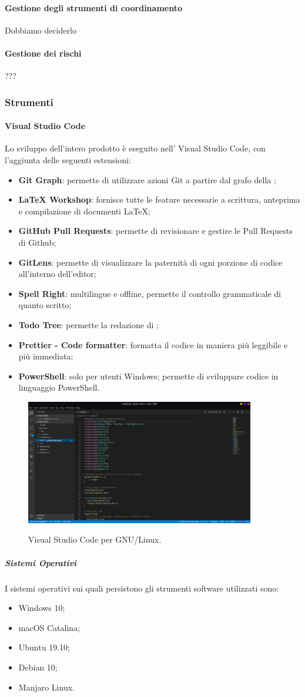 \documentclass[../norme-di-progetto.tex]{subfiles}
\begin{document}
\paragraph{Gestione degli strumenti di coordinamento}
Dobbiamo deciderlo
\paragraph{Gestione dei rischi}
???

\subsubsection{Strumenti}
\paragraph{Visual Studio Code}
Lo sviluppo dell'intero prodotto è eseguito nell' Visual Studio Code, con l'aggiunta delle seguenti estensioni:
\begin{itemize}
  \item \textbf{Git Graph}: permette di utilizzare azioni Git a partire dal grafo della ;
  \item \textbf{LaTeX Workshop}: fornisce tutte le feature necessarie a scrittura, anteprima e compilazione di documenti \LaTeX;
  \item \textbf{GitHub Pull Requests}: permette di revisionare e gestire le Pull Requests di Github;
  \item \textbf{GitLens}: permette di visualizzare la paternità di ogni porzione di codice all'interno dell'editor;
  \item \textbf{Spell Right}:  multilingue e offline, permette il controllo grammaticale di quanto scritto;
  \item \textbf{Todo Tree}: permette la redazione di ;
  \item \textbf{Prettier - Code formatter}: formatta il codice in maniera più leggibile e più immediata;
  \item \textbf{PowerShell}: solo per utenti Windows; permette di sviluppare codice in linguaggio PowerShell.
\end{itemize}

\begin{figure}[H]
  \centering
  \includegraphics[width=10cm]{img/vscode.png}
  \label{fig:github}
  \caption{Visual Studio Code per GNU/Linux.}
\end{figure}

\subparagraph{Sistemi Operativi}
I sistemi operativi sui quali persistono gli strumenti software utilizzati sono:
\begin{itemize}
  \item Windows 10;
  \item macOS Catalina;
  \item Ubuntu 19.10;
  \item Debian 10;
  \item Manjaro Linux.
\end{itemize}
\end{document}
